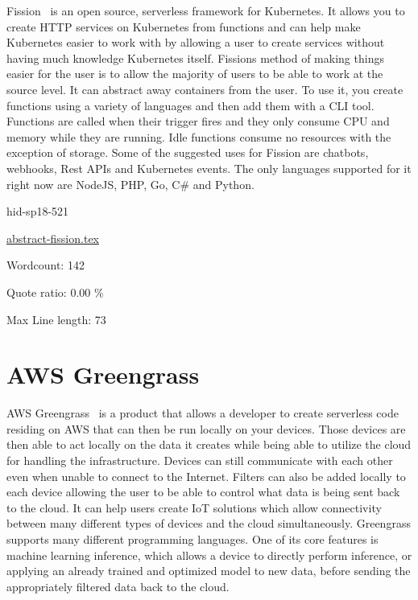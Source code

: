 Fission~\cite{hid-sp18-521-FissionBlog} is an open source, serverless
framework for Kubernetes. It allows you to create HTTP services
on Kubernetes from functions and can help make Kubernetes easier
to work with by allowing a user to create services without having
much knowledge Kubernetes itself. Fissions method of making things easier
for the user is to allow the majority of users to be able to work at the
source level. It can abstract away containers from the user. To use 
it, you create functions using a variety of languages and then add them
with a CLI tool. Functions are called when their trigger fires and they
only consume CPU and memory while they are running. Idle functions
consume no resources with the exception of storage. Some of the 
suggested uses for Fission are chatbots, webhooks, Rest APIs and 
Kubernetes events. The only languages supported for it right now
are NodeJS, PHP, Go, C\# and Python.


\begin{IU}

hid-sp18-521

\href{https://github.com/cloudmesh-community/hid-sp18-521/blob/master//technology/abstract-fission.tex}{abstract-fission.tex}

 

Wordcount: 142


Quote ratio: 0.00 \%
 
Max Line length: 73
\end{IU}

\section{AWS Greengrass}

AWS Greengrass~\cite{hid-sp18-521-Greengrass} is a product that allows a
developer to create serverless code residing on AWS that can then be run
locally on your devices. Those devices are then able to act locally on the data
it creates while being able to utilize the cloud for handling the infrastructure. 
Devices can still communicate with each other even when unable to connect to the
Internet. Filters can also be added locally to each device allowing the user to be 
able to control what data is being sent back to the cloud. It can help users create
IoT solutions which allow connectivity between many different types of devices
and the cloud simultaneously. Greengrass supports many different programming 
languages. One of its core features is machine learning inference, which allows
a device to directly perform inference, or applying an already trained and 
optimized model to new data, before sending the appropriately filtered data 
back to the cloud.  


